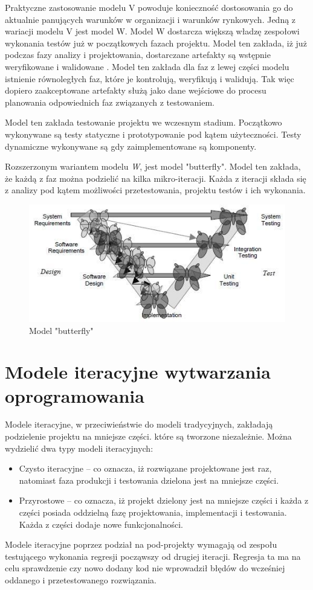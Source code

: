 Praktyczne zastosowanie modelu V powoduje konieczność dostosowania go do aktualnie panujących warunków w organizacji i warunków rynkowych. Jedną z wariacji modelu V jest model W. Model W dostarcza większą władzę zespołowi wykonania testów już w początkowych fazach projektu. Model ten zakłada, iż już podczas fazy analizy i projektowania, dostarczane artefakty są wstępnie weryfikowane i walidowane \cite{wmodel}. Model ten zakłada dla faz z lewej części modelu istnienie równoległych faz, które je kontrolują, weryfikują i walidują. Tak więc dopiero zaakceptowane artefakty służą jako dane wejściowe do procesu planowania odpowiednich faz związanych z testowaniem.

Model ten zakłada testowanie projektu we wczesnym stadium. Początkowo wykonywane są testy statyczne i prototypowanie pod kątem użyteczności. Testy dynamiczne wykonywane są gdy zaimplementowane są komponenty.


Rozszerzonym wariantem modelu \textit{W}, jest model "butterfly"\cite{BUTTERFLY}. Model ten zakłada, że każdą z faz można podzielić na kilka mikro-iteracji. Każda z iteracji składa się z analizy pod kątem możliwości przetestowania, projektu testów i ich wykonania. 
\begin{figure}[h]
\centerline{\includegraphics[scale=0.5]{img/butterflymodel2.JPG}}
\caption{Model "butterfly" \cite{BUTTERFLY}} 
\label{fig:vmodel}
\end{figure}
\section{Modele iteracyjne wytwarzania oprogramowania}
Modele iteracyjne, w przeciwieństwie do modeli tradycyjnych, zakładają podzielenie projektu na mniejsze części. które są tworzone niezależnie. Można wydzielić dwa typy modeli iteracyjnych:
\begin{itemize}
  \item Czysto iteracyjne -- co oznacza, iż rozwiązane projektowane jest raz, natomiast faza produkcji i testowania dzielona jest na mniejsze części.
  \item Przyrostowe -- co oznacza, iż projekt dzielony jest na mniejsze części i każda z części posiada oddzielną fazę projektowania, implementacji i testowania. Każda z części dodaje nowe funkcjonalności.
 
\end{itemize}
 Modele iteracyjne poprzez podział na pod-projekty wymagają od zespołu testującego wykonania regresji począwszy od drugiej iteracji. Regresja ta ma na celu sprawdzenie czy nowo dodany kod nie wprowadził błędów do wcześniej oddanego i przetestowanego rozwiązania.
